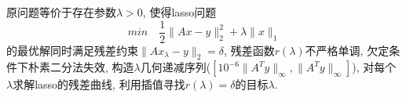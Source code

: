 \documentclass[UTF8]{ctexart}
\theoremstyle{definition}
\theoremstyle{examplestyle}
\theoremstyle{remark}
\begin{document}
原问题等价于存在参数$\lambda>0$, 使得lasso问题
\[min\quad \frac{1}{2}\|Ax-y\|_2^2+\lambda\|x\|_1\]
的最优解同时满足残差约束$\|Ax_\lambda-y\|_2=\delta$, 残差函数$r(\lambda)$不严格单调, 欠定条件下朴素二分法失效, 构造$\lambda$几何递减序列($[10^{-6}\|A^Ty\|_\infty,\|A^Ty\|_\infty]$), 对每个$\lambda$求解lasso的残差曲线, 利用插值寻找$r(\lambda)=\delta$的目标$\lambda$.
\end{document}
